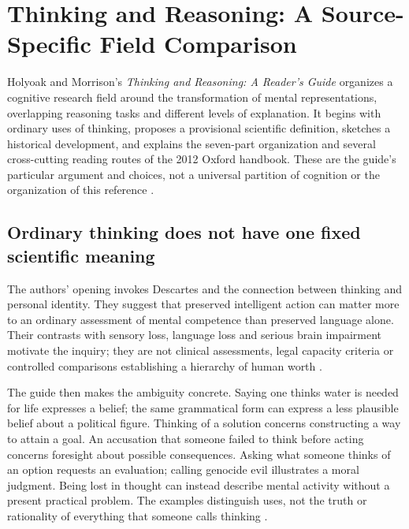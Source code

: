 \chapter{Thinking and Reasoning: A Source-Specific Field Comparison}
\label{sec:p11-thinking-and-reasoning-comparison}

Holyoak and Morrison's \emph{Thinking and Reasoning: A Reader's Guide}
organizes a cognitive research field around the transformation of mental
representations, overlapping reasoning tasks and different levels of
explanation. It begins with ordinary uses of thinking, proposes a provisional
scientific definition, sketches a historical development, and explains the
seven-part organization and several cross-cutting reading routes of the
2012 Oxford handbook. These are the guide's particular argument and choices,
not a universal partition of cognition or the organization of this reference
\parencite[pp.~1--8]{HolyoakMorrison2012ReadersGuide}.

\section{Ordinary thinking does not have one fixed scientific meaning}
\label{sec:p11-ohtr1-ordinary}

The authors' opening invokes Descartes and the connection between thinking
and personal identity. They suggest that preserved intelligent action can
matter more to an ordinary assessment of mental competence than preserved
language alone. Their contrasts with sensory loss, language loss and serious
brain impairment motivate the inquiry; they are not clinical assessments,
legal capacity criteria or controlled comparisons establishing a hierarchy
of human worth \parencite[p.~1]{HolyoakMorrison2012ReadersGuide}.

The guide then makes the ambiguity concrete. Saying one thinks water is
needed for life expresses a belief; the same grammatical form can express a
less plausible belief about a political figure. Thinking of a solution
concerns constructing a way to attain a goal. An accusation that someone
failed to think before acting concerns foresight about possible consequences.
Asking what someone thinks of an option requests an evaluation; calling
genocide evil illustrates a moral judgment. Being lost in thought can instead
describe mental activity without a present practical problem.
The examples distinguish uses, not the truth or rationality of everything
that someone calls thinking \parencite[p.~1]{HolyoakMorrison2012ReadersGuide}.

